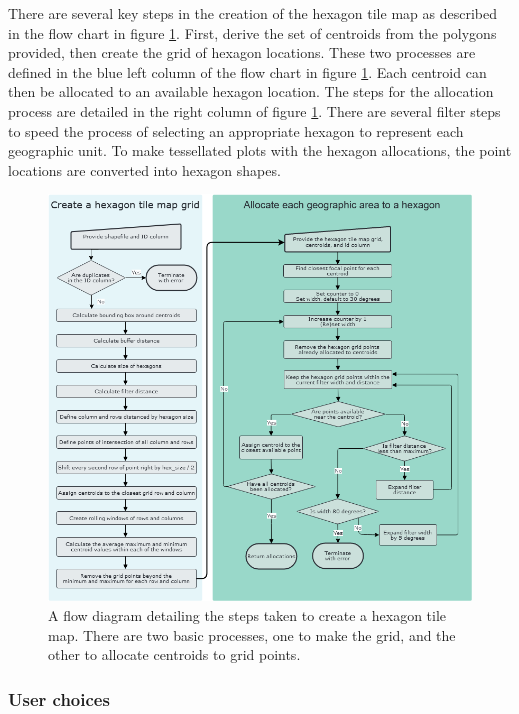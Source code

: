 There are several key steps in the creation of the hexagon tile map as
described in the flow chart in figure \ref{fig:sugarbag_flow}. First,
derive the set of centroids from the polygons provided, then create the
grid of hexagon locations. These two processes are defined in the blue
left column of the flow chart in figure \ref{fig:sugarbag_flow}. Each
centroid can then be allocated to an available hexagon location. The
steps for the allocation process are detailed in the right column of
figure \ref{fig:sugarbag_flow}. There are several filter steps to speed
the process of selecting an appropriate hexagon to represent each
geographic unit. To make tessellated plots with the hexagon allocations,
the point locations are converted into hexagon shapes.

\begin{figure}
\includegraphics[width=14cm]{figs/sugarbag flow.png}
\caption{\label{fig:sugarbag_flow}A flow diagram detailing the steps taken to create a hexagon tile map. There are two basic processes, one to make the grid, and the other to allocate centroids to grid points.}
\end{figure}

\hypertarget{user-choices}{%
\subsubsection{User choices}\label{user-choices}}

